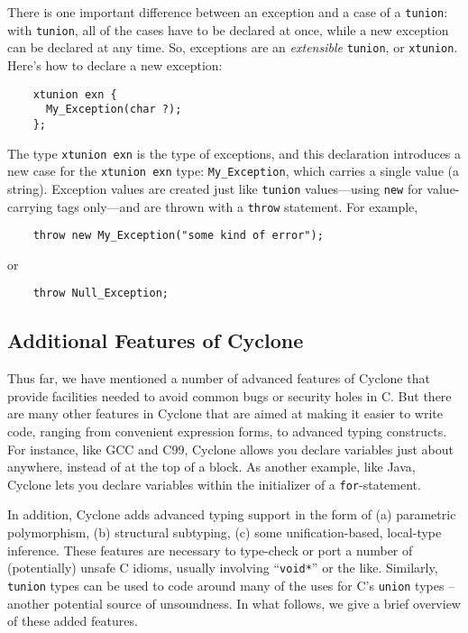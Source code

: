 There is one important difference between an exception and a case of a
\texttt{tunion}: with \texttt{tunion}, all of the cases have to be
declared at once, while a new exception can be declared at any time.
So, exceptions are an \emph{extensible} \texttt{tunion}, or
\texttt{xtunion}.  Here's how to declare a new exception:
\begin{verbatim}
    xtunion exn {
      My_Exception(char ?);
    };
\end{verbatim}
The type \texttt{xtunion exn} is the type of exceptions, and this
declaration introduces a new case for the \texttt{xtunion exn} type:
\texttt{My_Exception}, which carries a single value (a string).
Exception values are created just like \texttt{tunion} values---using
\texttt{new} for value-carrying tags only---and are thrown with a
\texttt{throw} statement.  For example,
\begin{verbatim}
    throw new My_Exception("some kind of error");
\end{verbatim}
or
\begin{verbatim}
    throw Null_Exception;
\end{verbatim}

\subsection{Additional Features of Cyclone}

Thus far, we have mentioned a number of advanced features of
Cyclone that provide facilities needed to avoid common bugs
or security holes in C.  
But there are many other features in Cyclone that are
aimed at making it easier to write code, ranging from convenient
expression forms, to advanced typing constructs.  For instance,
like GCC and C99, Cyclone allows you declare variables just
about anywhere, instead of at the top of a block.  As another
example, like Java, Cyclone lets you declare variables within
the initializer of a \texttt{for}-statement.  

In addition, Cyclone adds advanced typing support in the form of (a)
parametric polymorphism, (b) structural subtyping, (c) some
unification-based, local-type inference.  These features are necessary
to type-check or port a number of (potentially) unsafe C idioms,
usually involving ``\texttt{void*}'' or the like.  Similarly, \texttt{tunion}
types can be used to code around many of the uses for C's \texttt{union} types
-- another potential source of unsoundness.  
In what follows, we give a brief overview of these added features.

